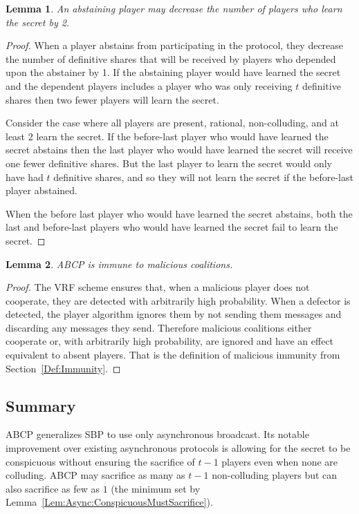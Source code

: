 \documentclass{dalcsthesis}
\newtheorem{lemma}{Lemma}
\begin{document}
\begin{lemma}\label{Lem:ABCP:AbstainBad}An abstaining player may decrease the number of players who learn the secret by 2.\end{lemma}
\begin{proof}
When a player abstains from participating in the protocol, they decrease the number of definitive shares that will be received by players who depended upon the abstainer by 1. If the abstaining player would have learned the secret and the dependent players includes a player who was only receiving $t$ definitive shares then two fewer players will learn the secret.

Consider the case where all players are present, rational, non-colluding, and at least 2 learn the secret. If the before-last player who would have learned the secret abstains then the last player who would have learned the secret will receive one fewer definitive shares. But the last player to learn the secret would only have had $t$ definitive shares, and so they will not learn the secret if the before-last player abstained.

When the before last player who would have learned the secret abstains, both the last and before-last players who would have learned the secret fail to learn the secret.
\end{proof}

\begin{lemma}\label{Lem:ABCP:MalImmune}ABCP is immune to malicious coalitions.\end{lemma}
\begin{proof}
The VRF scheme ensures that, when a malicious player does not cooperate, they are detected with arbitrarily high probability. When a defector is detected, the player algorithm ignores them by not sending them messages and discarding any messages they send. Therefore malicious coalitions either cooperate or, with arbitrarily high probability, are ignored and have an effect equivalent to absent players. That is the definition of malicious immunity from Section~\ref{Def:Immunity}.
\end{proof}

\subsection{Summary}

ABCP generalizes SBP to use only asynchronous broadcast. Its notable improvement over existing asynchronous protocols is allowing for the secret to be conspicuous without ensuring the sacrifice of $t-1$ players even when none are colluding. ABCP may sacrifice as many as $t-1$ non-colluding players but can also sacrifice as few as $1$ (the minimum set by Lemma~\ref{Lem:Async:ConspicuousMustSacrifice}).
\end{document}
